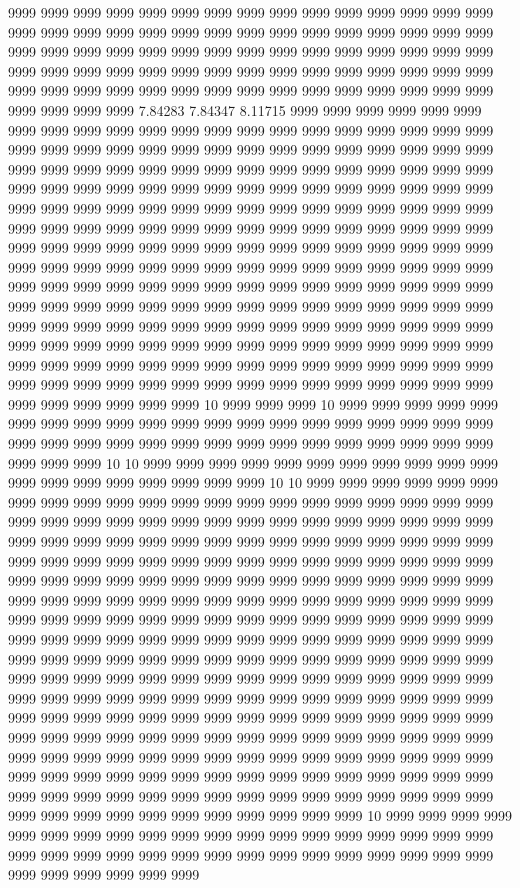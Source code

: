 9999 9999 9999 9999 9999 9999 9999 9999 9999 9999 9999 9999 9999 9999 9999 9999 9999 9999 9999 9999 9999 9999 9999 9999 9999 9999 9999 9999 9999 9999 9999 9999 9999 9999 9999 9999 9999 9999 9999 9999 9999 9999 9999 9999 9999 9999 9999 9999 9999 9999 9999 9999 9999 9999 9999 9999 9999 9999 9999 9999 9999 9999 9999 9999 9999 9999 9999 9999 9999 9999 9999 9999 9999 9999 9999 9999 9999 9999 9999 7.84283 7.84347 8.11715 9999 9999 9999 9999 9999 9999 9999 9999 9999 9999 9999 9999 9999 9999 9999 9999 9999 9999 9999 9999 9999 9999 9999 9999 9999 9999 9999 9999 9999 9999 9999 9999 9999 9999 9999 9999 9999 9999 9999 9999 9999 9999 9999 9999 9999 9999 9999 9999 9999 9999 9999 9999 9999 9999 9999 9999 9999 9999 9999 9999 9999 9999 9999 9999 9999 9999 9999 9999 9999 9999 9999 9999 9999 9999 9999 9999 9999 9999 9999 9999 9999 9999 9999 9999 9999 9999 9999 9999 9999 9999 9999 9999 9999 9999 9999 9999 9999 9999 9999 9999 9999 9999 9999 9999 9999 9999 9999 9999 9999 9999 9999 9999 9999 9999 9999 9999 9999 9999 9999 9999 9999 9999 9999 9999 9999 9999 9999 9999 9999 9999 9999 9999 9999 9999 9999 9999 9999 9999 9999 9999 9999 9999 9999 9999 9999 9999 9999 9999 9999 9999 9999 9999 9999 9999 9999 9999 9999 9999 9999 9999 9999 9999 9999 9999 9999 9999 9999 9999 9999 9999 9999 9999 9999 9999 9999 9999 9999 9999 9999 9999 9999 9999 9999 9999 9999 9999 9999 9999 9999 9999 9999 9999 9999 9999 9999 9999 9999 9999 9999 9999 9999 9999 9999 9999 9999 9999 9999 9999 9999 9999 9999 9999 9999 9999 9999 9999 9999 9999 9999 9999 9999 9999 10 9999 9999 9999 10 9999 9999 9999 9999 9999 9999 9999 9999 9999 9999 9999 9999 9999 9999 9999 9999 9999 9999 9999 9999 9999 9999 9999 9999 9999 9999 9999 9999 9999 9999 9999 9999 9999 9999 9999 9999 9999 9999 10 10 9999 9999 9999 9999 9999 9999 9999 9999 9999 9999 9999 9999 9999 9999 9999 9999 9999 9999 9999 10 10 9999 9999 9999 9999 9999 9999 9999 9999 9999 9999 9999 9999 9999 9999 9999 9999 9999 9999 9999 9999 9999 9999 9999 9999 9999 9999 9999 9999 9999 9999 9999 9999 9999 9999 9999 9999 9999 9999 9999 9999 9999 9999 9999 9999 9999 9999 9999 9999 9999 9999 9999 9999 9999 9999 9999 9999 9999 9999 9999 9999 9999 9999 9999 9999 9999 9999 9999 9999 9999 9999 9999 9999 9999 9999 9999 9999 9999 9999 9999 9999 9999 9999 9999 9999 9999 9999 9999 9999 9999 9999 9999 9999 9999 9999 9999 9999 9999 9999 9999 9999 9999 9999 9999 9999 9999 9999 9999 9999 9999 9999 9999 9999 9999 9999 9999 9999 9999 9999 9999 9999 9999 9999 9999 9999 9999 9999 9999 9999 9999 9999 9999 9999 9999 9999 9999 9999 9999 9999 9999 9999 9999 9999 9999 9999 9999 9999 9999 9999 9999 9999 9999 9999 9999 9999 9999 9999 9999 9999 9999 9999 9999 9999 9999 9999 9999 9999 9999 9999 9999 9999 9999 9999 9999 9999 9999 9999 9999 9999 9999 9999 9999 9999 9999 9999 9999 9999 9999 9999 9999 9999 9999 9999 9999 9999 9999 9999 9999 9999 9999 9999 9999 9999 9999 9999 9999 9999 9999 9999 9999 9999 9999 9999 9999 9999 9999 9999 9999 9999 9999 9999 9999 9999 9999 9999 9999 9999 9999 9999 9999 9999 9999 9999 9999 9999 9999 9999 9999 9999 9999 9999 9999 9999 9999 9999 9999 9999 9999 9999 9999 9999 9999 9999 9999 9999 9999 9999 9999 10 9999 9999 9999 9999 9999 9999 9999 9999 9999 9999 9999 9999 9999 9999 9999 9999 9999 9999 9999 9999 9999 9999 9999 9999 9999 9999 9999 9999 9999 9999 9999 9999 9999 9999 9999 9999 9999 9999 9999 9999 